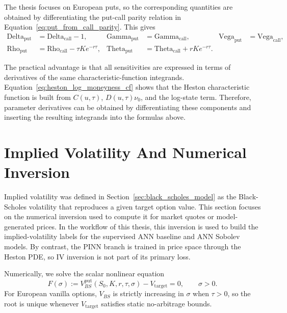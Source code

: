 The thesis focuses on European puts, so the corresponding quantities are obtained by differentiating the put-call parity relation in Equation~\eqref{eq:put_from_call_parity}. This gives
\begin{equation}
\begin{aligned}
\mathrm{Delta}_{\mathrm{put}}&=\mathrm{Delta}_{\mathrm{call}}-1, &
\mathrm{Gamma}_{\mathrm{put}}&=\mathrm{Gamma}_{\mathrm{call}}, &
\mathrm{Vega}_{\mathrm{put}}&=\mathrm{Vega}_{\mathrm{call}},\\
\mathrm{Rho}_{\mathrm{put}}&=\mathrm{Rho}_{\mathrm{call}}-\tau K e^{-r\tau}, &
\mathrm{Theta}_{\mathrm{put}}&=\mathrm{Theta}_{\mathrm{call}}+rK e^{-r\tau}.
\end{aligned}
\end{equation}

The practical advantage is that all sensitivities are expressed in terms of derivatives of the same characteristic-function integrands. Equation~\eqref{eq:heston_log_moneyness_cf} shows that the Heston characteristic function is built from \(C(u,\tau)\), \(D(u,\tau)\nu_0\), and the log-state term. Therefore, parameter derivatives can be obtained by differentiating these components and inserting the resulting integrands into the formulas above.


\section{Implied Volatility And Numerical Inversion}
\label{sec:iv_numerical_inversion}
Implied volatility was defined in Section~\ref{sec:black_scholes_model} as the Black-Scholes volatility that reproduces a given target option value. This section focuses on the numerical inversion used to compute it for market quotes or model-generated prices. In the workflow of this thesis, this inversion is used to build the implied-volatility labels for the supervised ANN baseline and ANN Sobolev models. By contrast, the PINN branch is trained in price space through the Heston PDE, so IV inversion is not part of its primary loss.

Numerically, we solve the scalar nonlinear equation
\begin{equation}
    F(\sigma):=V_{BS}^{\mathrm{put}}(S_0,K,r,\tau,\sigma)-V_{\text{target}}=0,\qquad \sigma>0.
\end{equation}
For European vanilla options, $V_{BS}$ is strictly increasing in $\sigma$ when $\tau>0$, so the root is unique whenever $V_{\text{target}}$ satisfies static no-arbitrage bounds.

